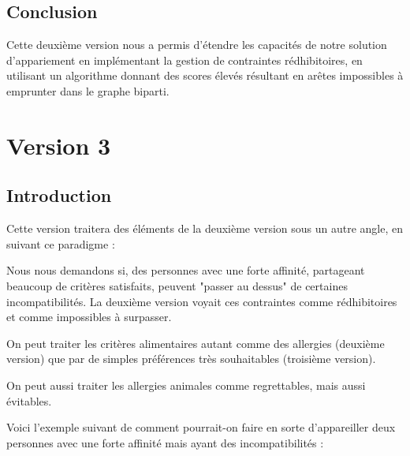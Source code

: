 \documentclass{mytex}
\begin{document}

\subsection{Conclusion}
Cette deuxième version nous a permis d'étendre les capacités de notre solution d'appariement en implémentant la gestion de contraintes rédhibitoires, en utilisant un algorithme donnant des scores élevés résultant en arêtes impossibles à emprunter dans le graphe biparti.

\section{Version 3}

\subsection{Introduction}

Cette version traitera des éléments de la deuxième version sous un autre angle, en suivant ce paradigme :


Nous nous demandons si, des personnes avec une forte affinité, partageant beaucoup de critères satisfaits, peuvent "passer au dessus" de certaines incompatibilités.
La deuxième version voyait ces contraintes comme rédhibitoires et comme impossibles à surpasser.


On peut traiter les critères alimentaires autant comme des allergies (deuxième version) que par de simples préférences très souhaitables (troisième version).

On peut aussi traiter les allergies animales comme regrettables, mais aussi évitables.

Voici l'exemple suivant de comment pourrait-on faire en sorte d'appareiller deux personnes avec une forte affinité mais ayant des incompatibilités :
\end{document}
